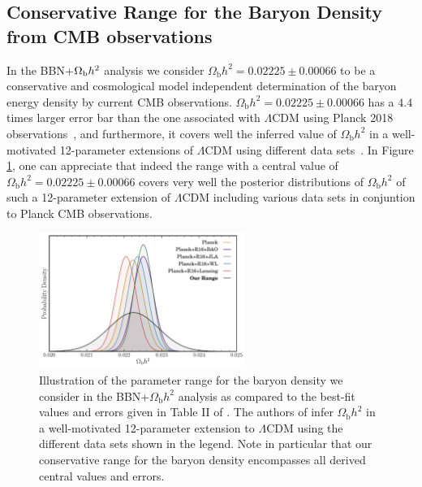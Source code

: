 \documentclass[notitlepage,letterpaper,natbib,aps,prd,onecolumn,amsmath,amsfonts,nofootinbib,preprintnumbers,superscriptaddress,secnumarabic,groupedaddress]{revtex4-1}
\begin{document}
\subsection{Conservative Range for the Baryon Density from CMB observations} \label{app:Omegab}

In the BBN+$\Omega_{\rm b}h^2$ analysis we consider $\Omega_\mathrm{b} h^2 = 0.02225 \pm 0.00066$ to be a conservative and cosmological model independent determination of the baryon energy density by current CMB observations. $\Omega_\mathrm{b} h^2 = 0.02225 \pm 0.00066$ has a $4.4$ times larger error bar than the one associated with $\Lambda\text{CDM}$ using Planck 2018 observations~\cite{Aghanim:2018eyx}, and furthermore, it covers well the inferred value of $\Omega_\mathrm{b} h^2$ in a well-motivated 12-parameter extensions of $\Lambda$CDM using different data sets~\cite{DiValentino:2016hlg,DiValentino:2017zyq}. In Figure \ref{fig:omegab}, one can appreciate that indeed the range with a central value of $\Omega_\mathrm{b} h^2 = 0.02225 \pm 0.00066$ covers very well the posterior distributions of $\Omega_\mathrm{b} h^2 $ of such a 12-parameter extension of $\Lambda$CDM including various data sets in conjuntion to Planck CMB observations. 

\begin{figure}[h]
    \centering
    \includegraphics[width=0.6\textwidth]{figures/omegabposteriors.pdf}\vspace{-0.3cm}
    \caption{Illustration of the parameter range for the baryon density we consider in the BBN+$\Omega_{\mathrm{b}}h^2$ analysis as compared to the best-fit values and errors given in Table II of \cite{DiValentino:2017zyq}. The authors of \cite{DiValentino:2017zyq} infer $\Omega_{\mathrm{b}}h^2$ in a well-motivated 12-parameter extension to $\Lambda$CDM using the different data sets shown in the legend. Note in particular that our conservative range for the baryon density encompasses all derived central values and errors.}
    \label{fig:omegab}
\end{figure}
\end{document}

